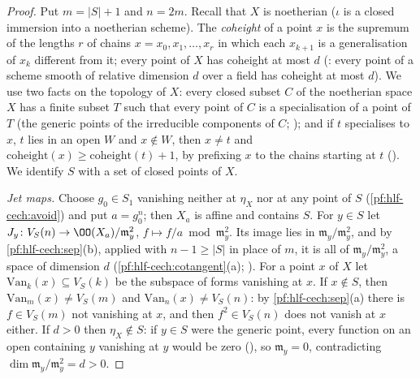 \begin{proof}
Put $m=|S|+1$ and $n=2m$. Recall that $X$ is noetherian ($\iota$ is a closed immersion into a noetherian scheme). The \emph{coheight} of a point
$x$ is the supremum of the lengths $r$ of chains $x=x_0,x_1,\dots,x_r$ in which each $x_{k+1}$ is a generalisation of $x_k$ different from it; every
point of $X$ has coheight at most $d$ (: every point of a scheme smooth of relative
dimension $d$ over a field has coheight at most $d$). We use two facts on the topology of $X$: every closed subset $C$ of the noetherian space $X$
has a finite subset $T$ such that every point of $C$ is a specialisation of a point of $T$ (the generic points of the irreducible components of
$C$; ); and if $t$ specialises to $x$, $t$ lies in an open $W$ and $x\notin W$, then $x\ne t$
and $\mathrm{coheight}(x)\ge\mathrm{coheight}(t)+1$, by prefixing $x$ to the chains starting at $t$ ().
We identify $S$ with a set of closed points of $X$.

\emph{Jet maps.} Choose $g_0\in S_1$ vanishing neither at $\eta_X$ nor at any point of $S$ (\cref{pf:hlf-cech:avoid}) and put $a=g_0^n$; then
$X_a$ is affine and contains $S$. For $y\in S$ let $J_y\colon V_S(n)\to\OO(X_a)/\mathfrak m_y^2$, $f\mapsto f/a\bmod\mathfrak m_y^2$. Its image lies in
$\mathfrak m_y/\mathfrak m_y^2$, and by \cref{pf:hlf-cech:sep}(b), applied with $n-1\ge|S|$ in place of $m$, it is all of
$\mathfrak m_y/\mathfrak m_y^2$, a space of dimension $d$ (\cref{pf:hlf-cech:cotangent}(a); ).
For a point $x$ of $X$ let $\mathrm{Van}_k(x)\subseteq V_S(k)$ be the subspace of forms vanishing at $x$. If $x\notin S$, then
$\mathrm{Van}_m(x)\ne V_S(m)$ and $\mathrm{Van}_n(x)\ne V_S(n)$: by \cref{pf:hlf-cech:sep}(a) there is $f\in V_S(m)$ not vanishing at $x$, and then
$f^2\in V_S(n)$ does not vanish at $x$ either. If $d>0$ then $\eta_X\notin S$: if $y\in S$ were the generic point, every function on an open
containing $y$ vanishing at $y$ would be zero (), so $\mathfrak m_y=0$, contradicting
$\dim\mathfrak m_y/\mathfrak m_y^2=d>0$.


\end{proof}
